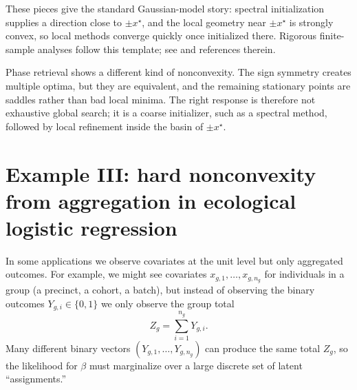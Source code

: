 \documentclass[11pt]{article}
\newif\ifshowsolutions
\newcommand{\SolutionBox}[2][10]{%
  \ifshowsolutions
    \begin{tcolorbox}[stat221panelgray,title={Solution}]
    #2
    \end{tcolorbox}
  \else
    \begin{tcolorbox}[stat221panelgray,unbreakable,title={Workspace}]
    \vspace{#1\baselineskip}
    \end{tcolorbox}
  \fi
}
\begin{document}
\SolutionBox[12]{%
Differentiate the gradient formula in the solution to \Cref{ex:phase-pop-derivation}:
for $x\in\R^d$,
\[
\Hess f(x)=12xx^\top + (6\norm{x}_2^2-2\norm{x^\star}_2^2)I_d - 4x^\star(x^\star)^\top.
\]
At $x=x^\star$ this becomes
\[
\Hess f(x^\star)=(12-4)x^\star(x^\star)^\top + 4\norm{x^\star}_2^2 I_d
=8x^\star(x^\star)^\top + 4\norm{x^\star}_2^2 I_d.
\]
Along $u^\star=x^\star/\norm{x^\star}_2$ the eigenvalue is $12\norm{x^\star}_2^2$, and along any direction orthogonal to $x^\star$ the eigenvalue is $4\norm{x^\star}_2^2$.
So near $x^\star$ the population objective is well conditioned (local condition number $3$), which is exactly the regime where local methods behave like in the convex case.%
}

These pieces give the standard Gaussian-model story:
spectral initialization supplies a direction close to $\pm x^\star$, and the local geometry near $\pm x^\star$ is strongly convex, so local methods converge quickly once initialized there.
Rigorous finite-sample analyses follow this template; see \citet[\S2.2]{zhang_qu_wright_2020_symmetry_geometry} and references therein.

Phase retrieval shows a different kind of nonconvexity.
The sign symmetry creates multiple optima, but they are equivalent, and the remaining stationary points are saddles rather than bad local minima.
The right response is therefore not exhaustive global search; it is a coarse initializer, such as a spectral method, followed by local refinement inside the basin of $\pm x^\star$.



\section[Example III (ecological logistic)]{Example III: hard nonconvexity from aggregation in ecological logistic regression}
\label{sec:ecological-logistic}

In some applications we observe covariates at the unit level but only aggregated outcomes.
For example, we might see covariates $x_{g,1},\dots,x_{g,n_g}$ for individuals in a group (a precinct, a cohort, a batch),
but instead of observing the binary outcomes $Y_{g,i}\in\{0,1\}$ we only observe the group total
\[
Z_g = \sum_{i=1}^{n_g} Y_{g,i}.
\]
Many different binary vectors $(Y_{g,1},\dots,Y_{g,n_g})$ can produce the same total $Z_g$, so the likelihood for $\beta$ must marginalize over a large discrete set of latent ``assignments.''
\end{document}

